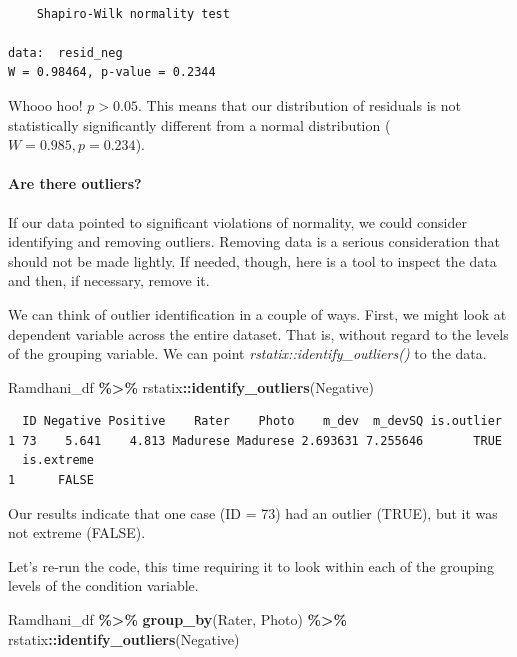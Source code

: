 \documentclass[
  11pt,
]{book}
\newenvironment{Shaded}{\begin{snugshade}}{\end{snugshade}}
\newcommand{\FunctionTok}[1]{\textcolor[rgb]{0.27,0.27,0.27}{\textbf{#1}}}
\newcommand{\NormalTok}[1]{#1}
\newcommand{\SpecialCharTok}[1]{\textcolor[rgb]{0.43,0.43,0.43}{\textbf{#1}}}
\begin{document}
\begin{verbatim}

    Shapiro-Wilk normality test

data:  resid_neg
W = 0.98464, p-value = 0.2344
\end{verbatim}

Whooo hoo! \(p > 0.05\). This means that our distribution of residuals is not statistically significantly different from a normal distribution (\(W = 0.985, p = 0.234\)).

\hypertarget{are-there-outliers}{%
\paragraph{Are there outliers?}\label{are-there-outliers}}

If our data pointed to significant violations of normality, we could consider identifying and removing outliers. Removing data is a serious consideration that should not be made lightly. If needed, though, here is a tool to inspect the data and then, if necessary, remove it.

We can think of outlier identification in a couple of ways. First, we might look at dependent variable across the entire dataset. That is, without regard to the levels of the grouping variable. We can point \emph{rstatix::identify\_outliers()} to the data.

\begin{Shaded}
\begin{Highlighting}[]
\NormalTok{Ramdhani\_df }\SpecialCharTok{\%\textgreater{}\%}
\NormalTok{    rstatix}\SpecialCharTok{::}\FunctionTok{identify\_outliers}\NormalTok{(Negative)}
\end{Highlighting}
\end{Shaded}

\begin{verbatim}
  ID Negative Positive    Rater    Photo    m_dev  m_devSQ is.outlier
1 73    5.641    4.813 Madurese Madurese 2.693631 7.255646       TRUE
  is.extreme
1      FALSE
\end{verbatim}

Our results indicate that one case (ID = 73) had an outlier (TRUE), but it was not extreme (FALSE).

Let's re-run the code, this time requiring it to look within each of the grouping levels of the condition variable.

\begin{Shaded}
\begin{Highlighting}[]
\NormalTok{Ramdhani\_df }\SpecialCharTok{\%\textgreater{}\%}
    \FunctionTok{group\_by}\NormalTok{(Rater, Photo) }\SpecialCharTok{\%\textgreater{}\%}
\NormalTok{    rstatix}\SpecialCharTok{::}\FunctionTok{identify\_outliers}\NormalTok{(Negative)}
\end{Highlighting}
\end{Shaded}
\end{document}
